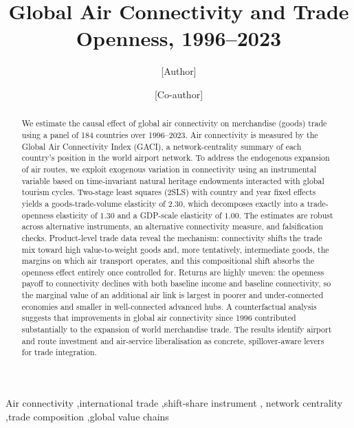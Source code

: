 \begin{frontmatter}

\title{Global Air Connectivity and Trade Openness, 1996--2023}

\author[a]{[Author]}
\ead{[email]}
\author[a]{[Co-author]}
\address[a]{[Affiliation], Kyushu University, Fukuoka, Japan}

\begin{abstract}
We estimate the causal effect of global air connectivity on merchandise (goods) trade using a panel of 184 countries over 1996--2023. Air connectivity is measured by the Global Air Connectivity Index (GACI), a
network-centrality summary of each country's position in the world airport network. To address the endogenous expansion of air routes, we exploit exogenous variation in connectivity using an instrumental variable based on time-invariant natural heritage endowments interacted with global tourism cycles. Two-stage least squares (2SLS) with country and year fixed effects yields a goods-trade-volume elasticity of $2.30$, which decomposes exactly into a trade-openness elasticity of $1.30$ and a GDP-scale elasticity of $1.00$. The estimates are robust across alternative instruments, an alternative connectivity measure, and falsification checks. Product-level trade data reveal the mechanism: connectivity shifts the trade mix toward high value-to-weight goods and, more tentatively, intermediate goods, the margins on which air transport operates, and this compositional shift absorbs the openness effect entirely once controlled for. Returns are highly uneven: the openness payoff to connectivity declines with both baseline income and baseline connectivity, so the marginal value of an additional air link is largest in poorer and under-connected economies and smaller in well-connected advanced hubs. A counterfactual analysis suggests that improvements in global air connectivity since 1996 contributed substantially to the expansion of world merchandise trade. The results identify airport and route investment and air-service liberalisation as concrete, spillover-aware levers for trade integration.
\end{abstract}

\begin{keyword}
Air connectivity \sep international trade \sep shift-share instrument \sep
network centrality \sep trade composition \sep global value chains
\end{keyword}

\end{frontmatter}

